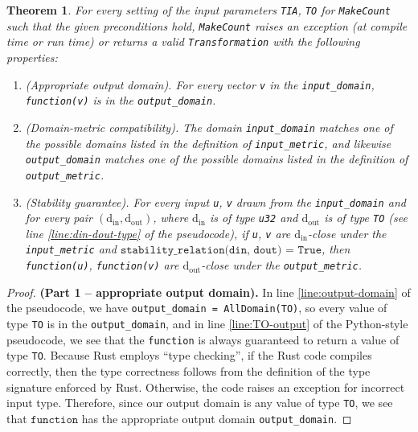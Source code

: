 \documentclass[12pt,letterpaper]{article}
\newcommand{\din}{\mathrm{d_{in}}}
\newcommand{\dout}{\mathrm{d_{out}}}
\newcommand{\function}{\texttt{function}}
\newtheorem{theorem}{Theorem}[section]
\theoremstyle{definition}
\begin{document}
\begin{theorem}
\label{thrm:domain-and-stability}
    For every setting of the input parameters \texttt{TIA}, \texttt{TO} for \texttt{MakeCount} such that the given preconditions hold, \texttt{MakeCount} raises an exception (at compile time or run time) or returns a valid \texttt{Transformation} with the following properties:
    \begin{enumerate}
        \item \textup{(Appropriate output domain).} For every vector \texttt{v} in the \texttt{input\_domain}, \texttt{function(v)} is in the \texttt{output\_domain}.
        
        \item \textup{(Domain-metric compatibility).} The domain \texttt{input\_domain} matches one of the possible domains listed in the definition of \texttt{input\_metric}, and likewise \texttt{output\_domain} matches one of the possible domains listed in the definition of \texttt{output\_metric}.
        
        \item \textup{(Stability guarantee).} For every input \texttt{u}, \texttt{v} drawn from the \texttt{input\_domain} and for every pair $(\din, \dout)$, where $\din$ is of type \texttt{u32} and $\dout$ is of type \texttt{TO} (see line \ref{line:din-dout-type} of the pseudocode), if \texttt{u}, \texttt{v} are $\din$-close under the \texttt{input\_metric} and $\texttt{stability\_relation(din, dout) = True}$, then \texttt{function(u)}, \texttt{function(v)} are $\dout$-close under the \texttt{output\_metric}.
    \end{enumerate}
\end{theorem}

\begin{proof} \textbf{(Part 1 -- appropriate output domain).}
In line \ref{line:output-domain} of the pseudocode, we have \texttt{output\_domain = AllDomain(TO)}, so every value of type \texttt{TO} is in the \texttt{output\_domain}, and in line \ref{line:TO-output} of the Python-style pseudocode, we see that the \texttt{function} is always guaranteed to return a value of type \texttt{TO}. Because Rust employs ``type checking'',
if the Rust code compiles correctly, then the type correctness follows from the definition of the type signature enforced by Rust. Otherwise, the code raises an exception for incorrect input type.
Therefore, since our output domain is any value of type \texttt{TO}, we see that $\function$ has the appropriate output domain \texttt{output\_domain}.

\end{proof}
\end{document}
